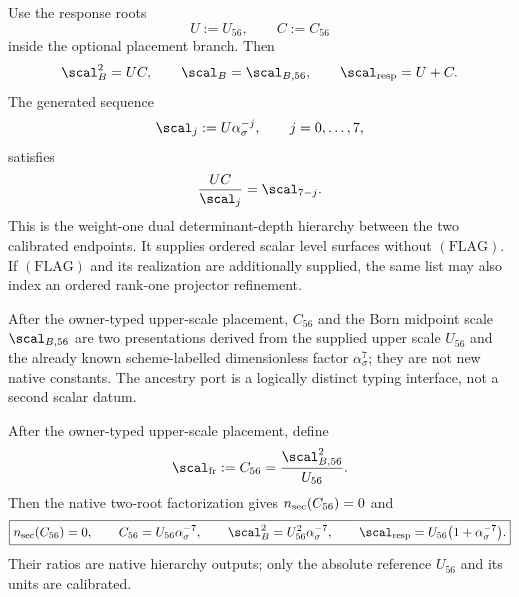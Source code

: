 \documentclass[11pt,a4paper]{article}
\begin{document}
\begin{corollary}
\label{p3:cor:S1-equals-R56}
Use the response roots
\[
 U:=U_{56},\qquad C:=C_{56}
\]
inside the optional placement branch.  Then
\[
 \scal_B^2=UC,
 \qquad
 \scal_B=\scal_{B,56},
 \qquad
 \scal_{\rm resp}=U+C.
\]
The generated sequence
\[
 \scal_j:=U\alpha_\sigma^{-j},\qquad j=0,\ldots,7,
\]
satisfies
\[
 \frac{UC}{\scal_j}=\scal_{7-j}.
\]
This is the weight-one dual determinant-depth hierarchy between the two calibrated
endpoints.  It supplies ordered scalar level surfaces without
\((\mathrm{FLAG})\).  If \((\mathrm{FLAG})\) and its realization are
additionally supplied, the same list may also index an ordered rank-one
projector refinement.
\end{corollary}

\begin{remark}
\label{p3:rem:c56-single-datum}
After the owner-typed upper-scale placement, \(C_{56}\) and the Born midpoint scale
\(\scal_{B,56}\) are two
presentations derived from the supplied upper scale \(U_{56}\) and the already
known scheme-labelled dimensionless factor \(\alpha_\sigma^{7}\); they are not new native
constants.  The ancestry port is a logically distinct typing interface, not a
second scalar datum.
\end{remark}

\begin{corollary}
\label{paper3g:corollary:atlas-calibrated-lower-root-notation-3303475}

After the owner-typed upper-scale placement, define
\begin{equation}
\label{p3:eq:terminal-active-curvature}
 \scal_{\rm fr}:=C_{56}=\frac{\scal_{B,56}^{2}}{U_{56}}.
\end{equation}
Then the native two-root factorization gives \(n_{\rm sec}(C_{56})=0\) and
\begin{equation}
\label{p3:eq:freeze-root-alpha}
 \boxed{
 n_{\rm sec}(C_{56})=0,
 \qquad
 C_{56}=U_{56}\alpha_\sigma^{-7},
 \qquad
 \scal_B^2=U_{56}^{2}\alpha_\sigma^{-7},
 \qquad
 \scal_{\rm resp}=U_{56}\bigl(1+\alpha_\sigma^{-7}\bigr).}
\end{equation}
Their ratios are native hierarchy outputs; only the absolute reference
\(U_{56}\) and its units are calibrated.
\end{corollary}
\end{document}
